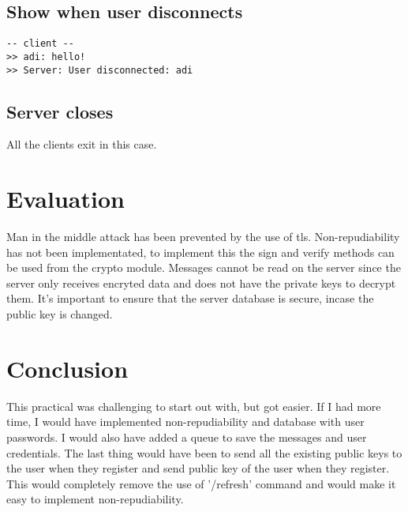 \documentclass[11pt]{article}
\begin{document}
\subsection{Show when user disconnects}
\label{sec:org0f22307}
\begin{verbatim}
-- client --
>> adi: hello!
>> Server: User disconnected: adi
\end{verbatim}

\subsection{Server closes}
\label{sec:org675c67b}
All the clients exit in this case.
\section{Evaluation}
\label{sec:org16f9762}
Man in the middle attack has been prevented by the use of tls. Non-repudiability has not been implementated, to implement this the sign and verify methods can be used from the crypto module. Messages cannot be read on the server since the server only receives encryted data and does not have the private keys to decrypt them. It's important to ensure that the server database is secure, incase the public key is changed.
\section{Conclusion}
\label{sec:org25e1935}
This practical was challenging to start out with, but got easier. If I had more time, I would have implemented non-repudiability and database with user passwords. I would also have added a queue to save the messages and user credentials. The last thing would have been to send all the existing public keys to the user when they register and send public key of the user when they register. This would completely remove the use of '/refresh' command and would make it easy to implement non-repudiability.
\end{document}
